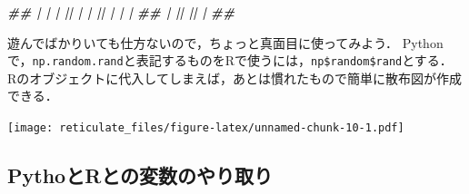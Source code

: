 \documentclass[
]{article}
\newenvironment{Shaded}{\begin{snugshade}}{\end{snugshade}}
\newcommand{\CommentTok}[1]{\textcolor[rgb]{0.56,0.35,0.01}{\textit{#1}}}
\newcommand{\DecValTok}[1]{\textcolor[rgb]{0.00,0.00,0.81}{#1}}
\newcommand{\DocumentationTok}[1]{\textcolor[rgb]{0.56,0.35,0.01}{\textbf{\textit{#1}}}}
\newcommand{\FunctionTok}[1]{\textcolor[rgb]{0.00,0.00,0.00}{#1}}
\newcommand{\NormalTok}[1]{#1}
\newcommand{\OtherTok}[1]{\textcolor[rgb]{0.56,0.35,0.01}{#1}}
\newcommand{\SpecialCharTok}[1]{\textcolor[rgb]{0.00,0.00,0.00}{#1}}
\newcommand{\StringTok}[1]{\textcolor[rgb]{0.31,0.60,0.02}{#1}}
\begin{document}
\begin{Shaded}
\begin{Highlighting}[]
\DocumentationTok{\#\# | |              | || |              | || |              | |}
\DocumentationTok{\#\# | \textquotesingle{}{-}{-}{-}{-}{-}{-}{-}{-}{-}{-}{-}{-}{-}{-}\textquotesingle{} || \textquotesingle{}{-}{-}{-}{-}{-}{-}{-}{-}{-}{-}{-}{-}{-}{-}\textquotesingle{} || \textquotesingle{}{-}{-}{-}{-}{-}{-}{-}{-}{-}{-}{-}{-}{-}{-}\textquotesingle{} |}
\DocumentationTok{\#\#  \textquotesingle{}{-}{-}{-}{-}{-}{-}{-}{-}{-}{-}{-}{-}{-}{-}{-}{-}\textquotesingle{}  \textquotesingle{}{-}{-}{-}{-}{-}{-}{-}{-}{-}{-}{-}{-}{-}{-}{-}{-}\textquotesingle{}  \textquotesingle{}{-}{-}{-}{-}{-}{-}{-}{-}{-}{-}{-}{-}{-}{-}{-}{-}\textquotesingle{} }
\end{Highlighting}
\end{Shaded}

遊んでばかりいても仕方ないので，ちょっと真面目に使ってみよう．
Pythonで，\texttt{np.random.rand}と表記するものをRで使うには，\texttt{np\$random\$rand}とする．
Rのオブジェクトに代入してしまえば，あとは慣れたもので簡単に散布図が作成できる．

\begin{Shaded}
\end{Shaded}

\texttt{[image: reticulate\_files/figure-latex/unnamed-chunk-10-1.pdf]}

\hypertarget{pythoux3068rux3068ux306eux5909ux6570ux306eux3084ux308aux53d6ux308a}{%
\subsection{PythoとRとの変数のやり取り}\label{pythoux3068rux3068ux306eux5909ux6570ux306eux3084ux308aux53d6ux308a}}
\end{document}
